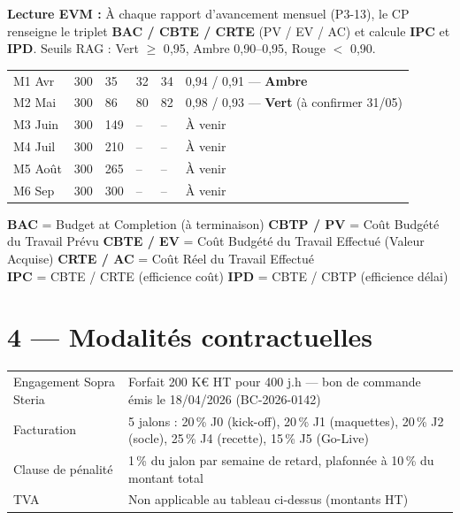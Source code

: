 \documentclass[11pt,a4paper,oneside]{report}
\begin{document}
\begin{finding}
\textbf{Lecture EVM :} À chaque rapport d'avancement mensuel (P3-13), le CP renseigne le triplet \textbf{BAC / CBTE / CRTE} (PV / EV / AC) et calcule \textbf{IPC} et \textbf{IPD}. Seuils RAG : Vert $\geq$ 0{,}95, Ambre 0{,}90--0{,}95, Rouge $<$ 0{,}90.
\end{finding}

\renewcommand{\arraystretch}{1.3}
\begin{tabularx}{\textwidth}{L{2cm} C{2cm} C{2cm} C{2cm} C{2cm} Y}
\toprule
{} &  &  &  &  &  \\
\midrule
M1 Avr & 300 & 35  & 32  & 34  & 0{,}94 / 0{,}91 --- \textbf{Ambre} \\
M2 Mai & 300 & 86  & 80  & 82  & 0{,}98 / 0{,}93 --- \textbf{Vert} (à confirmer 31/05) \\
M3 Juin & 300 & 149 & --  & --  & À venir \\
M4 Juil & 300 & 210 & --  & --  & À venir \\
M5 Août & 300 & 265 & --  & --  & À venir \\
M6 Sep  & 300 & 300 & --  & --  & À venir \\
\bottomrule
\end{tabularx}

\vspace{4pt}
{\footnotesize
\textbf{BAC} = Budget at Completion (à terminaison) \quad
\textbf{CBTP / PV} = Coût Budgété du Travail Prévu \quad
\textbf{CBTE / EV} = Coût Budgété du Travail Effectué (Valeur Acquise) \quad
\textbf{CRTE / AC} = Coût Réel du Travail Effectué \\
\textbf{IPC} = CBTE / CRTE \quad (efficience coût) \quad
\textbf{IPD} = CBTE / CBTP \quad (efficience délai)
}

\section*{4 --- Modalités contractuelles}

\renewcommand{\arraystretch}{1.3}
\begin{tabularx}{\textwidth}{L{4cm} Y}
\toprule
{} &  \\
\midrule
Engagement Sopra Steria & Forfait 200 K€ HT pour 400 j.h --- bon de commande émis le 18/04/2026 (BC-2026-0142) \\
Facturation             & 5 jalons : 20\,\% J0 (kick-off), 20\,\% J1 (maquettes), 20\,\% J2 (socle), 25\,\% J4 (recette), 15\,\% J5 (Go-Live) \\
Clause de pénalité      & 1\,\% du jalon par semaine de retard, plafonnée à 10\,\% du montant total \\
TVA                     & Non applicable au tableau ci-dessus (montants HT) \\
\bottomrule
\end{tabularx}
\end{document}
